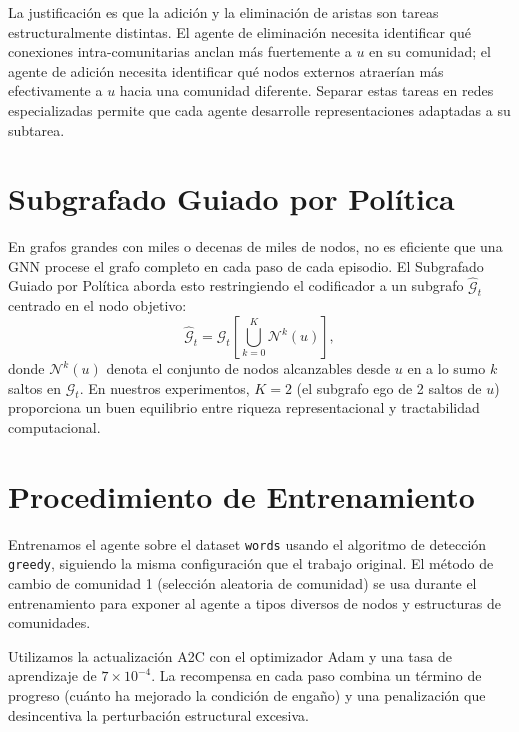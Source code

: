 \documentclass[11pt,a4paper,twoside]{tesis}
\newcommand{\G}{\mathcal{G}}
\begin{document}
La justificación es que la adición y la eliminación de aristas son tareas
estructuralmente distintas. El agente de eliminación necesita identificar qué conexiones
intra-comunitarias anclan más fuertemente a $u$ en su comunidad; el agente de adición
necesita identificar qué nodos externos atraerían más efectivamente a $u$ hacia una
comunidad diferente. Separar estas tareas en redes especializadas permite que cada
agente desarrolle representaciones adaptadas a su subtarea.

\section{Subgrafado Guiado por Política}
\label{sec:subgrafo}

En grafos grandes con miles o decenas de miles de nodos, no es eficiente que una GNN
procese el grafo completo en cada paso de cada episodio. El Subgrafado Guiado por
Política aborda esto restringiendo el codificador a un subgrafo $\hat{\G}_t$ centrado
en el nodo objetivo:
\[
\hat{\G}_t = \G_t\!\left[\bigcup_{k=0}^{K} \mathcal{N}^k(u)\right],
\]
donde $\mathcal{N}^k(u)$ denota el conjunto de nodos alcanzables desde $u$ en a lo
sumo $k$ saltos en $\G_t$. En nuestros experimentos, $K = 2$ (el subgrafo ego de 2
saltos de $u$) proporciona un buen equilibrio entre riqueza representacional y
tractabilidad computacional.

\section{Procedimiento de Entrenamiento}
\label{sec:entrenamiento}

Entrenamos el agente sobre el dataset \texttt{words} usando el algoritmo de detección
\texttt{greedy}, siguiendo la misma configuración que el trabajo original. El método de
cambio de comunidad 1 (selección aleatoria de comunidad) se usa durante el entrenamiento
para exponer al agente a tipos diversos de nodos y estructuras de comunidades.

Utilizamos la actualización A2C con el optimizador Adam y una tasa de aprendizaje de
$7 \times 10^{-4}$. La recompensa en cada paso combina un término de progreso (cuánto
ha mejorado la condición de engaño) y una penalización que desincentiva la perturbación
estructural excesiva.
\end{document}
